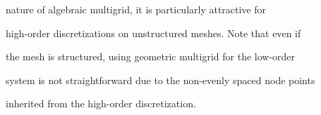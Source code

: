 \documentclass[smallcondensed,final]{svjour3}     %
\newcommand{\gsnote}[1]{\textcolor{blue}{GS: #1}}
\begin{document}
nature of algebraic multigrid, it is particularly attractive for

high-order discretizations on unstructured meshes.  Note that even if

the mesh is structured, using geometric multigrid for the low-order

system is not straightforward due to the non-evenly spaced node points

inherited from the high-order discretization.






























\end{document}
